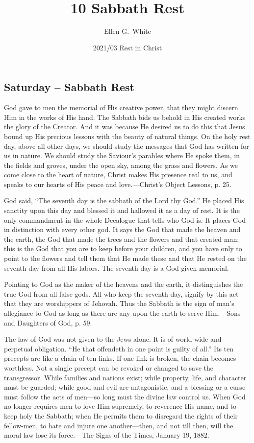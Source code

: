 \documentclass[a4paper, 10pt, twoside, headings=small]{scrartcl}
\title{10 Sabbath Rest}
\author{Ellen G.\ White}
\date{2021/03 Rest in Christ}
\begin{document}
\maketitle

\thispagestyle{empty}

\pagestyle{fancy}

\begin{multicols}{2}

\section*{Saturday – Sabbath Rest}

God gave to men the memorial of His creative power, that they might discern Him in the works of His hand. The Sabbath bids us behold in His created works the glory of the Creator. And it was because He desired us to do this that Jesus bound up His precious lessons with the beauty of natural things. On the holy rest day, above all other days, we should study the messages that God has written for us in nature. We should study the Saviour’s parables where He spoke them, in the fields and groves, under the open sky, among the grass and flowers. As we come close to the heart of nature, Christ makes His presence real to us, and speaks to our hearts of His peace and love.—Christ’s Object Lessons, p. 25.

God said, “The seventh day is the sabbath of the Lord thy God.” He placed His sanctity upon this day and blessed it and hallowed it as a day of rest. It is the only commandment in the whole Decalogue that tells who God is. It places God in distinction with every other god. It says the God that made the heaven and the earth, the God that made the trees and the flowers and that created man; this is the God that you are to keep before your children, and you have only to point to the flowers and tell them that He made these and that He rested on the seventh day from all His labors. The seventh day is a God-given memorial.

Pointing to God as the maker of the heavens and the earth, it distinguishes the true God from all false gods. All who keep the seventh day, signify by this act that they are worshippers of Jehovah. Thus the Sabbath is the sign of man’s allegiance to God as long as there are any upon the earth to serve Him.—Sons and Daughters of God, p. 59.

The law of God was not given to the Jews alone. It is of world-wide and perpetual obligation. “He that offendeth in one point is guilty of all.” Its ten precepts are like a chain of ten links. If one link is broken, the chain becomes worthless. Not a single precept can be revoked or changed to save the transgressor. While families and nations exist; while property, life, and character must be guarded; while good and evil are antagonistic, and a blessing or a curse must follow the acts of men—so long must the divine law control us. When God no longer requires men to love Him supremely, to reverence His name, and to keep holy the Sabbath; when He permits them to disregard the rights of their fellow-men, to hate and injure one another—then, and not till then, will the moral law lose its force.—The Signs of the Times, January 19, 1882.


\end{multicols}
\end{document}
